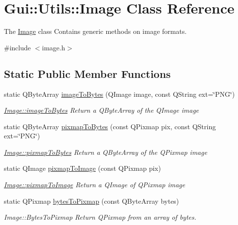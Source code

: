 \hypertarget{classGui_1_1Utils_1_1Image}{\section{Gui\-:\-:Utils\-:\-:Image Class Reference}
\label{classGui_1_1Utils_1_1Image}
}


The \hyperlink{classGui_1_1Utils_1_1Image}{Image} class Contains generic methods on image formats.  




{\ttfamily \#include $<$image.\-h$>$}

\subsection*{Static Public Member Functions}
\begin{DoxyCompactItemize}
\item 
static Q\-Byte\-Array \hyperlink{classGui_1_1Utils_1_1Image_aad7d91d84d4d6f51080eee06419aee80}{image\-To\-Bytes} (Q\-Image image, const Q\-String ext=\char`\"{}P\-N\-G\char`\"{})
\begin{DoxyCompactList}\small\item\em \hyperlink{classGui_1_1Utils_1_1Image_aad7d91d84d4d6f51080eee06419aee80}{Image\-::image\-To\-Bytes} Return a Q\-Byte\-Array of the Q\-Image {\itshape image} \end{DoxyCompactList}\item 
static Q\-Byte\-Array \hyperlink{classGui_1_1Utils_1_1Image_a6bf05a411daec780f12a690d0ce7a046}{pixmap\-To\-Bytes} (const Q\-Pixmap pix, const Q\-String ext=\char`\"{}P\-N\-G\char`\"{})
\begin{DoxyCompactList}\small\item\em \hyperlink{classGui_1_1Utils_1_1Image_a6bf05a411daec780f12a690d0ce7a046}{Image\-::pixmap\-To\-Bytes} Return a Q\-Byte\-Array of the Q\-Pixmap {\itshape image} \end{DoxyCompactList}\item 
static Q\-Image \hyperlink{classGui_1_1Utils_1_1Image_abd2651b6ee762ee438231288887235df}{pixmap\-To\-Image} (const Q\-Pixmap pix)
\begin{DoxyCompactList}\small\item\em \hyperlink{classGui_1_1Utils_1_1Image_abd2651b6ee762ee438231288887235df}{Image\-::pixmap\-To\-Image} Return a Q\-Image of Q\-Pixmap {\itshape image} \end{DoxyCompactList}\item 
static Q\-Pixmap \hyperlink{classGui_1_1Utils_1_1Image_a891cce6ddd74add919c2c68c90e46960}{bytes\-To\-Pixmap} (const Q\-Byte\-Array bytes)
\begin{DoxyCompactList}\small\item\em Image\-::\-Bytes\-To\-Pixmap Return Q\-Pixmap from an array of bytes. \end{DoxyCompactList}\end{DoxyCompactItemize}


